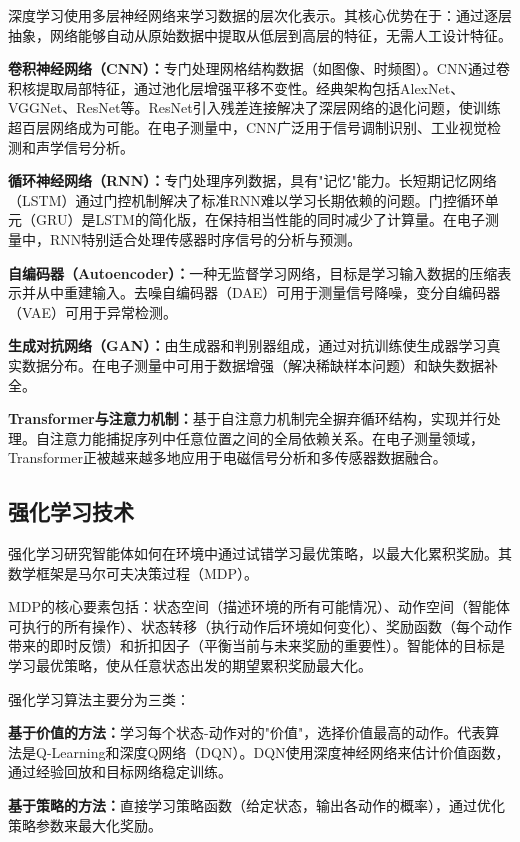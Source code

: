 \documentclass[12pt,a4paper]{article}
\numberwithin{figure}{section}
\numberwithin{table}{section}
\numberwithin{equation}{section}
\begin{document}
深度学习使用多层神经网络来学习数据的层次化表示。其核心优势在于：通过逐层抽象，网络能够自动从原始数据中提取从低层到高层的特征，无需人工设计特征。

\textbf{卷积神经网络（CNN）：}专门处理网格结构数据（如图像、时频图）。CNN通过卷积核提取局部特征，通过池化层增强平移不变性。经典架构包括AlexNet、VGGNet、ResNet等。ResNet引入残差连接解决了深层网络的退化问题，使训练超百层网络成为可能。在电子测量中，CNN广泛用于信号调制识别、工业视觉检测和声学信号分析。

\textbf{循环神经网络（RNN）：}专门处理序列数据，具有"记忆"能力。长短期记忆网络（LSTM）通过门控机制解决了标准RNN难以学习长期依赖的问题。门控循环单元（GRU）是LSTM的简化版，在保持相当性能的同时减少了计算量。在电子测量中，RNN特别适合处理传感器时序信号的分析与预测。

\textbf{自编码器（Autoencoder）：}一种无监督学习网络，目标是学习输入数据的压缩表示并从中重建输入。去噪自编码器（DAE）可用于测量信号降噪，变分自编码器（VAE）可用于异常检测。

\textbf{生成对抗网络（GAN）：}由生成器和判别器组成，通过对抗训练使生成器学习真实数据分布。在电子测量中可用于数据增强（解决稀缺样本问题）和缺失数据补全。

\textbf{Transformer与注意力机制：}基于自注意力机制完全摒弃循环结构，实现并行处理。自注意力能捕捉序列中任意位置之间的全局依赖关系。在电子测量领域，Transformer正被越来越多地应用于电磁信号分析和多传感器数据融合。

\subsection{强化学习技术}

强化学习研究智能体如何在环境中通过试错学习最优策略，以最大化累积奖励。其数学框架是马尔可夫决策过程（MDP）。

MDP的核心要素包括：状态空间（描述环境的所有可能情况）、动作空间（智能体可执行的所有操作）、状态转移（执行动作后环境如何变化）、奖励函数（每个动作带来的即时反馈）和折扣因子（平衡当前与未来奖励的重要性）。智能体的目标是学习最优策略，使从任意状态出发的期望累积奖励最大化。

强化学习算法主要分为三类：

\textbf{基于价值的方法：}学习每个状态-动作对的"价值"，选择价值最高的动作。代表算法是Q-Learning和深度Q网络（DQN）。DQN使用深度神经网络来估计价值函数，通过经验回放和目标网络稳定训练。

\textbf{基于策略的方法：}直接学习策略函数（给定状态，输出各动作的概率），通过优化策略参数来最大化奖励。
\end{document}

